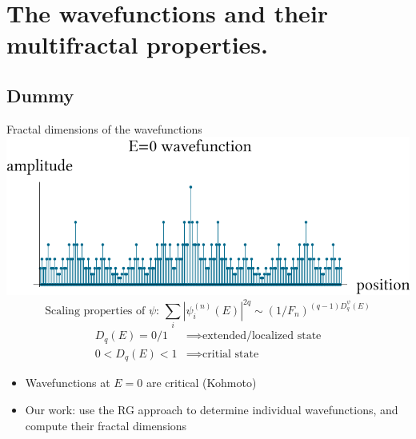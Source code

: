 \documentclass[xcolor=x11names,compress,professionalfonts]{beamer}
\renewcommand{\(}{\begin{columns}}
\renewcommand{\)}{\end{columns}}
\newcommand{\<}[1]{\begin{column}{#1}}
\renewcommand{\>}{\end{column}}
\begin{document}
\section{The wavefunctions and their multifractal properties.}
\subsection{Dummy}
\begin{frame}{Fractal dimensions of the wavefunctions}
	\centering
	\includegraphics[scale=.55]{E0_wavefunction.pdf}
	\[
	\text{Scaling properties of $\psi$:~} 
	\sum_i |\psi_i^{(n)}(E)|^{2q} \sim (1/F_n)^{(q-1)D_q^\psi(E)} 
	\]
	\begin{align*}
	D_q(E) = 0/1 &\implies \text{extended/localized state}  \\
	0 < D_q(E) < 1 &\implies \text{critial state}
	\end{align*}
\begin{itemize}
	\item Wavefunctions at $E=0$ are critical (Kohmoto)
	\item Our work: use the RG approach to determine individual wavefunctions, and compute their fractal dimensions
\end{itemize}
\end{frame}
\end{document}
